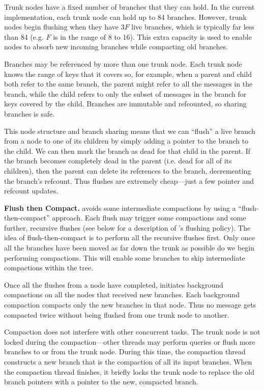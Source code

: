 Trunk nodes have a fixed number of branches that they can hold.  In
the current \sysname implementation, each trunk node can hold up to 84
branches.  However, trunk nodes begin flushing when they have $3F$
live branches, which is typically far less than 84 (e.g. $F$ is in the
range of 8 to 16).  This extra capacity is used to enable nodes to
absorb new incoming branches while compacting old branches.

Branches may be referenced by more than one trunk node.  Each trunk
node knows the range of keys that it covers so, for example, when a
parent and child both refer to the same branch, the parent might refer
to all the messages in the branch, while the child refers to only the
subset of messages in the branch for keys covered by the child.
Branches are immutable and refcounted, so sharing branches is safe.

This node structure and branch sharing means that we can ``flush'' a
live branch from a node to one of its children by simply adding a
pointer to the branch to the child. We can then mark the branch as
dead for that child in the parent.  If the branch becomes completely
dead in the parent (i.e. dead for all of its children), then the
parent can delete its references to the branch, decrementing the
branch's refcount.  Thus flushes are extremely cheap---just a few
pointer and refcount updates.

\textbf{Flush then Compact.}  \sysname avoids some intermediate
compactions by using a ``flush-then-compact'' approach.  Each flush
may trigger some compactions and some further, recursive flushes (see
below for a description of \sysname's flushing policy).  The idea of
flush-then-compact is to perform all the recursive flushes first.
Only once all the branches have been moved as far down the trunk as
possible do we begin performing compactions.  This will enable some
branches to skip intermediate compactions within the tree.

Once all the flushes from a node have completed, \sysname initiates
background compactions on all the nodes that received new branches.
Each background compaction compacts only the new branches in that node.
Thus no message gets compacted twice without being flushed from one
trunk node to another.

Compaction does not interfere with other concurrent tasks.  The trunk
node is not locked during the compaction---other threads may perform
queries or flush more branches to or from the trunk node.  During this
time, the compaction thread constructs a new branch that is the
compaction of all its input branches.  When the compaction thread
finishes, it briefly locks the trunk node to replace the old branch
pointers with a pointer to the new, compacted branch.

